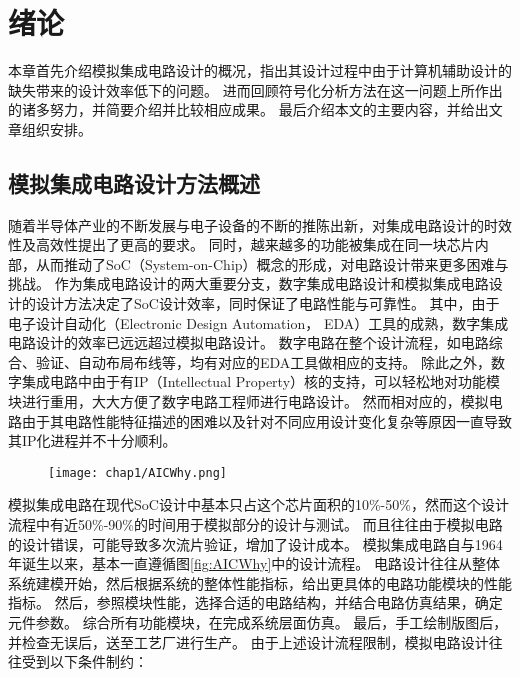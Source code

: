 
\chapter{绪论}
\label{chap:intro}

本章首先介绍模拟集成电路设计的概况，指出其设计过程中由于计算机辅助设计的缺失带来的设计效率低下的问题。
进而回顾符号化分析方法在这一问题上所作出的诸多努力，并简要介绍并比较相应成果。
最后介绍本文的主要内容，并给出文章组织安排。

\section{模拟集成电路设计方法概述}
\label{sec:intro:analog}
随着半导体产业的不断发展与电子设备的不断的推陈出新，对集成电路设计的时效性及高效性提出了更高的要求。
同时，越来越多的功能被集成在同一块芯片内部，从而推动了SoC（System-on-Chip）概念的形成，对电路设计带来更多困难与挑战\parencite{Saleh-SoC-2006}。
作为集成电路设计的两大重要分支，数字集成电路设计和模拟集成电路设计的设计方法决定了SoC设计效率，同时保证了电路性能与可靠性。
其中，由于电子设计自动化（Electronic Design Automation， EDA）工具的成熟，数字集成电路设计的效率已远远超过模拟电路设计\parencite{Ghasi-VLSID-2009}。
数字电路在整个设计流程，如电路综合、验证、自动布局布线等，均有对应的EDA工具做相应的支持。
除此之外，数字集成电路中由于有IP（Intellectual Property）核的支持，可以轻松地对功能模块进行重用，大大方便了数字电路工程师进行电路设计。
然而相对应的，模拟电路由于其电路性能特征描述的困难以及针对不同应用设计变化复杂等原因一直导致其IP化进程并不十分顺利\parencite{Zheying-ICASIC-2003, Saleh-SoC-2006}。

\begin{figure}[!htp]
	\centering
	\texttt{[image: chap1/AICWhy.png]}
\end{figure}

模拟集成电路在现代SoC设计中基本只占这个芯片面积的10\%-50\%，然而这个设计流程中有近50\%-90\%的时间用于模拟部分的设计与测试\parencite{Gabriel-AICWhy}。
而且往往由于模拟电路的设计错误，可能导致多次流片验证，增加了设计成本。
模拟集成电路自与1964年诞生以来\parencite{Thomas-AICHistory-2007}，基本一直遵循图\ref{fig:AICWhy}中的设计流程。
电路设计往往从整体系统建模开始，然后根据系统的整体性能指标，给出更具体的电路功能模块的性能指标。
然后，参照模块性能，选择合适的电路结构，并结合电路仿真结果，确定元件参数。
综合所有功能模块，在完成系统层面仿真。
最后，手工绘制版图后，并检查无误后，送至工艺厂进行生产。
由于上述设计流程限制，模拟电路设计往往受到以下条件制约：

